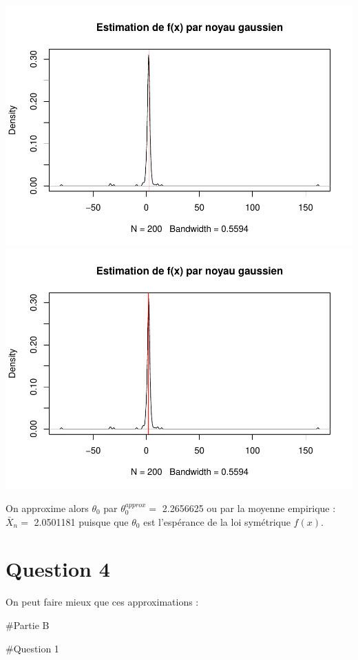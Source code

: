 \documentclass[
]{article}
\begin{document}
\includegraphics{DM_files/figure-latex/unnamed-chunk-4-1.pdf}
\includegraphics{DM_files/figure-latex/unnamed-chunk-4-2.pdf}

On approxime alors \(\theta_{0}\) par \(\theta_{0}^{approx} =\)
2.2656625 ou par la moyenne empirique : \(\bar{X}_{n} =\) 2.0501181
puisque que \(\theta_{0}\) est l'espérance de la loi symétrique
\(f(x)\).

\hypertarget{question-4}{%
\section{Question 4}\label{question-4}}

On peut faire mieux que ces approximations :

\#Partie B

\#Question 1
\end{document}
